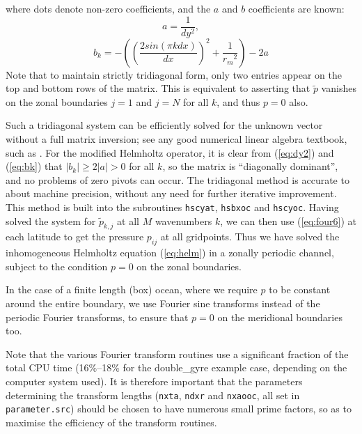 \documentclass[11pt, a4paper,twoside]{article}
\newcommand{\rdm}[0]{{r_m}}
\numberwithin{equation}{section}
\begin{document}
where dots denote non-zero coefficients, and the $a$ and $b$ coefficients are known:
\begin{equation}\label{eq:dy2}
a = \frac{1}{dy^2},
\end{equation}
\begin{equation}\label{eq:bk}
 b_k = - \left( \left( \frac{2 sin(\pi k dx)}{dx} \right)^2 + \frac{1}{\rdm^2}\right) - 2a
\end{equation}
Note that to maintain strictly tridiagonal form, only two entries appear on the top and bottom rows of the matrix.
This is equivalent to asserting that $\tilde{p}$ vanishes on the zonal boundaries $j=1$ and $j=N$ for all $k$, and thus $p=0$ also.

Such a tridiagonal system can be efficiently solved for the unknown vector without a full matrix inversion; see any good numerical linear algebra textbook, such as \citet{press:92}.
For the modified Helmholtz operator, it is clear from (\ref{eq:dy2}) and (\ref{eq:bk}) that $|b_k| \ge 2|a| > 0$ for all $k$, so the matrix is ``diagonally dominant'', and no problems of zero pivots can occur.
The tridiagonal method is accurate to about machine precision, without any need for further iterative improvement. 
This method is built into the subroutines \verb=hscyat=, \verb=hsbxoc= and \verb=hscyoc=.
Having solved the system for $\tilde{p}_{k,j}$ at all $M$ wavenumbers $k$, we can then use (\ref{eq:four6}) at each latitude to get the pressure $p_{ij}$ at all gridpoints.
Thus we have solved the inhomogeneous Helmholtz equation (\ref{eq:helm}) in a zonally periodic channel, subject to the condition $p = 0$ on the zonal boundaries.

In the case of a finite length (box) ocean, where we require $p$ to be constant around the entire boundary, we use Fourier sine transforms instead of the periodic Fourier transforms, to ensure that $p = 0$ on the meridional boundaries too.

Note that the various Fourier transform routines use a significant fraction of the total CPU time (16\%--18\% for the double\_gyre example case, depending on the computer system used).
It is therefore important that the parameters determining the transform lengths (\verb=nxta=, \verb=ndxr= and \verb=nxaooc=, all set in \verb=parameter.src=) should be chosen to have numerous small prime factors, so as to maximise the efficiency of the transform routines.
\end{document}
